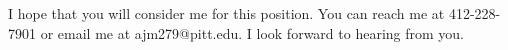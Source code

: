 \documentclass[11pt, a4paper]{awesome-cv}
\begin{document}
\begin{cvletter}
I hope that you will consider me for this position. You can reach me at 412-228-7901 or email me at ajm279@pitt.edu. I look forward to hearing from you.  


\end{cvletter}


\makeletterclosing
\end{document}
